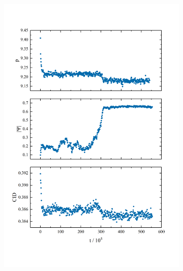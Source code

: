\documentclass[a4paper]{article}
\begin{document}
\begin{figure}[ht]
	\begin{subfigure}[ht]{.5\textwidth}
		\centering 
		\includegraphics[width=1\columnwidth]{t_evo_714.png}
	\end{subfigure}
	\begin{subfigure}[ht]{.5\textwidth}
		\centering

\end{subfigure}
\end{figure}
\end{document}
